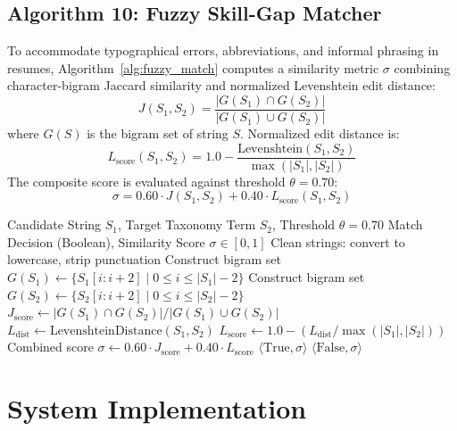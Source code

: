 \documentclass[conference]{IEEEtran}
\begin{document}
\subsection{Algorithm 10: Fuzzy Skill-Gap Matcher}
To accommodate typographical errors, abbreviations, and informal phrasing in resumes, Algorithm~\ref{alg:fuzzy_match} computes a similarity metric $\sigma$ combining character-bigram Jaccard similarity and normalized Levenshtein edit distance:
\begin{equation}
J(S_1, S_2) = \frac{|G(S_1) \cap G(S_2)|}{|G(S_1) \cup G(S_2)|}
\label{eq:jaccard}
\end{equation}
where $G(S)$ is the bigram set of string $S$. Normalized edit distance is:
\begin{equation}
L_{\text{score}}(S_1, S_2) = 1.0 - \frac{\text{Levenshtein}(S_1, S_2)}{\max(|S_1|, |S_2|)}
\end{equation}
The composite score is evaluated against threshold $\theta = 0.70$:
\begin{equation}
\sigma = 0.60 \cdot J(S_1, S_2) + 0.40 \cdot L_{\text{score}}(S_1, S_2)
\end{equation}

\begin{algorithm}[htbp]
\caption{Fuzzy Bigram Skill Matcher}
\label{alg:fuzzy_match}
\begin{algorithmic}[1]
\REQUIRE Candidate String $S_1$, Target Taxonomy Term $S_2$, Threshold $\theta = 0.70$
\ENSURE Match Decision (Boolean), Similarity Score $\sigma \in [0, 1]$
\STATE Clean strings: convert to lowercase, strip punctuation
\STATE Construct bigram set $G(S_1) \leftarrow \{ S_1[i:i+2] \mid 0 \le i \le |S_1|-2 \}$
\STATE Construct bigram set $G(S_2) \leftarrow \{ S_2[i:i+2] \mid 0 \le i \le |S_2|-2 \}$
\STATE $J_{\text{score}} \leftarrow |G(S_1) \cap G(S_2)| / |G(S_1) \cup G(S_2)|$
\STATE $L_{\text{dist}} \leftarrow \text{LevenshteinDistance}(S_1, S_2)$
\STATE $L_{\text{score}} \leftarrow 1.0 - (L_{\text{dist}} / \max(|S_1|, |S_2|))$
\STATE Combined score $\sigma \leftarrow 0.60 \cdot J_{\text{score}} + 0.40 \cdot L_{\text{score}}$
\IF{$\sigma \ge \theta$}
    \RETURN $\langle \text{True}, \sigma \rangle$
\ELSE
    \RETURN $\langle \text{False}, \sigma \rangle$
\ENDIF
\end{algorithmic}
\end{algorithm}

\section{System Implementation}
\label{sec:implementation}
\end{document}
